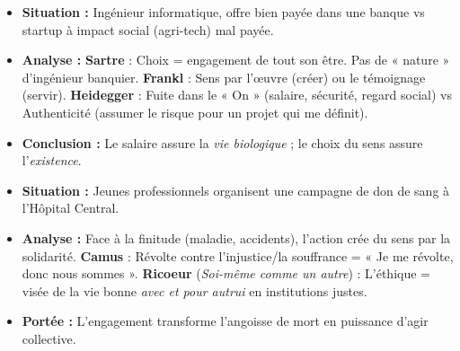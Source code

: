 \documentclass[11pt]{article}
\newcommand{\cle}[1]{{\popxbold\color{popdark}#1}}
\begin{document}
\begin{exemplebox}
\begin{itemize}
    \item \textbf{Situation :} Ingénieur informatique, offre bien payée dans une banque vs startup à impact social (agri-tech) mal payée.
    \item \textbf{Analyse :} \textbf{Sartre} : Choix = engagement de tout son être. Pas de « nature » d'ingénieur banquier. \textbf{Frankl} : Sens par l'œuvre (créer) ou le témoignage (servir). \textbf{Heidegger} : Fuite dans le « On » (salaire, sécurité, regard social) vs Authenticité (assumer le risque pour un projet qui me définit).
    \item \textbf{Conclusion :} Le salaire assure la \emph{vie biologique} ; le choix du sens assure l'\emph{existence}.
\end{itemize}
\end{exemplebox}

\begin{exemplebox}
\begin{itemize}
    \item \textbf{Situation :} Jeunes professionnels organisent une campagne de don de sang à l'Hôpital Central.
    \item \textbf{Analyse :} Face à la \cle{finitude} (maladie, accidents), l'action crée du \cle{sens} par la \cle{solidarité}. \textbf{Camus} : Révolte contre l'injustice/la souffrance = « Je me révolte, donc nous sommes ». \textbf{Ricoeur} (\emph{Soi-même comme un autre}) : L'éthique = visée de la vie bonne \emph{avec et pour autrui} en institutions justes.
    \item \textbf{Portée :} L'engagement transforme l'angoisse de mort en \cle{puissance d'agir} collective.
\end{itemize}
\end{exemplebox}
\end{document}
